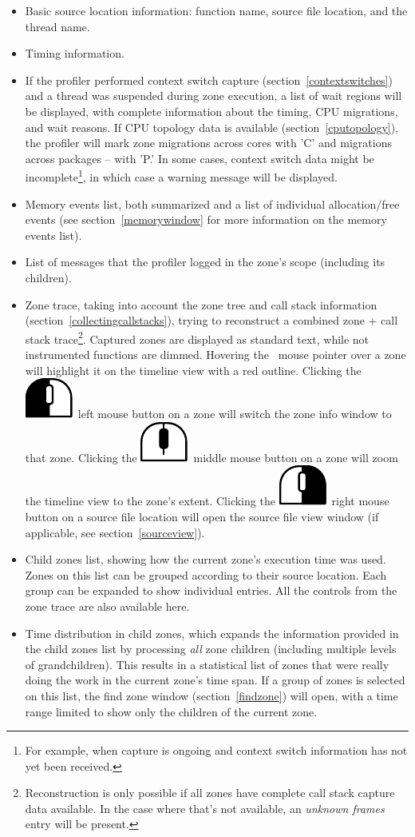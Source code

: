 \documentclass[hidelinks,titlepage,a4paper]{article}
\newcommand{\LMB}{\includegraphics[height=.8\baselineskip]{icons/lmb}}
\newcommand{\RMB}{\includegraphics[height=.8\baselineskip]{icons/rmb}}
\newcommand{\MMB}{\includegraphics[height=.8\baselineskip]{icons/mmb}}
\begin{document}
\begin{itemize}
\item Basic source location information: function name, source file location, and the thread name.
\item Timing information.
\item If the profiler performed context switch capture (section~\ref{contextswitches}) and a thread was suspended during zone execution, a list of wait regions will be displayed, with complete information about the timing, CPU migrations, and wait reasons. If CPU topology data is available (section~\ref{cputopology}), the profiler will mark zone migrations across cores with 'C' and migrations across packages -- with 'P.' In some cases, context switch data might be incomplete\footnote{For example, when capture is ongoing and context switch information has not yet been received.}, in which case a warning message will be displayed.
\item Memory events list, both summarized and a list of individual allocation/free events (see section~\ref{memorywindow} for more information on the memory events list).
\item List of messages that the profiler logged in the zone's scope (including its children).
\item Zone trace, taking into account the zone tree and call stack information (section~\ref{collectingcallstacks}), trying to reconstruct a combined zone + call stack trace\footnote{Reconstruction is only possible if all zones have complete call stack capture data available. In the case where that's not available, an \emph{unknown frames} entry will be present.}. Captured zones are displayed as standard text, while not instrumented functions are dimmed. Hovering the \faMousePointer{}~mouse pointer over a zone will highlight it on the timeline view with a red outline. Clicking the \LMB{}~left mouse button on a zone will switch the zone info window to that zone. Clicking the \MMB{}~middle mouse button on a zone will zoom the timeline view to the zone's extent. Clicking the \RMB{}~right mouse button on a source file location will open the source file view window (if applicable, see section~\ref{sourceview}).
\item Child zones list, showing how the current zone's execution time was used. Zones on this list can be grouped according to their source location. Each group can be expanded to show individual entries. All the controls from the zone trace are also available here.
\item Time distribution in child zones, which expands the information provided in the child zones list by processing \emph{all} zone children (including multiple levels of grandchildren). This results in a statistical list of zones that were really doing the work in the current zone's time span. If a group of zones is selected on this list, the find zone window (section~\ref{findzone}) will open, with a time range limited to show only the children of the current zone.
\end{itemize}
\end{document}
